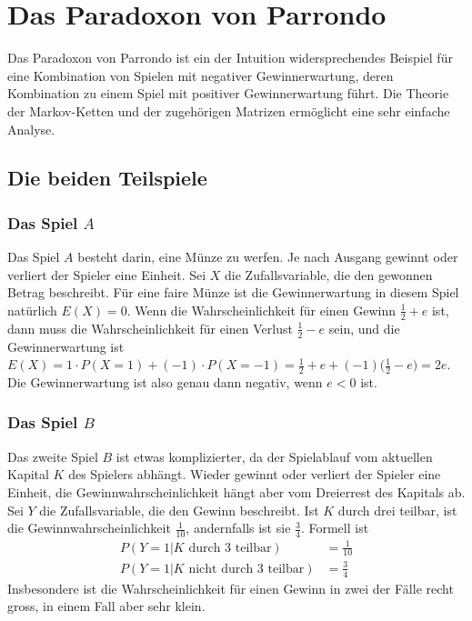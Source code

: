 %
%
%
\section{Das Paradoxon von Parrondo
\label{buch:section:paradoxon-von-parrondo}}
Das Paradoxon von Parrondo ist ein der Intuition widersprechendes
Beispiel für eine Kombination von Spielen mit negativer Gewinnerwartung,
deren Kombination zu einem Spiel mit positiver Gewinnerwartung führt.
Die Theorie der Markov-Ketten und der zugehörigen Matrizen ermöglicht
eine sehr einfache Analyse.

%
%
\subsection{Die beiden Teilspiele
\label{buch:subsection:teilspiele}}

\subsubsection{Das Spiel $A$}
Das Spiel $A$ besteht darin, eine Münze zu werfen.
Je nach Ausgang gewinnt oder verliert der Spieler eine Einheit.
Sei $X$ die Zufallsvariable, die den gewonnen Betrag beschreibt.
Für eine faire Münze ist die Gewinnerwartung in diesem Spiel natürlich
$E(X)=0$.
Wenn die Wahrscheinlichkeit für einen Gewinn $\frac12+e$ ist, dann muss
die Wahrscheinlichkeit für einen Verlust $\frac12-e$ sein, und die 
Gewinnerwartung ist
\(
E(X)
=
1\cdot P(X=1) + (-1)\cdot P(X=-1)
=
\frac12+e + (-1)\biggl(\frac12-e\biggr)
=
2e.
\)
Die Gewinnerwartung ist also genau dann negativ, wenn $e<0$ ist.

\subsubsection{Das Spiel $B$}
Das zweite Spiel $B$ ist etwas komplizierter, da der Spielablauf vom 
aktuellen Kapital $K$ des Spielers abhängt.
Wieder gewinnt oder verliert der Spieler eine Einheit,
die Gewinnwahrscheinlichkeit hängt aber vom Dreierrest des Kapitals ab.
Sei $Y$ die Zufallsvariable, die den Gewinn beschreibt.
Ist $K$ durch drei teilbar, ist die Gewinnwahrscheinlichkeit $\frac1{10}$,
andernfalls ist sie $\frac34$.
Formell ist
\begin{equation}
\begin{aligned}
P(Y=1|\text{$K$ durch $3$ teilbar}) &=  \frac{1}{10}
\\
P(Y=1|\text{$K$ nicht durch $3$ teilbar}) &= \frac{3}{4}
\end{aligned}
\label{buch:wahrscheinlichkeit:eqn:Bwahrscheinlichkeiten}
\end{equation}
Insbesondere ist die Wahrscheinlichkeit für einen Gewinn in zwei der
Fälle recht gross, in einem Fall aber sehr klein.

